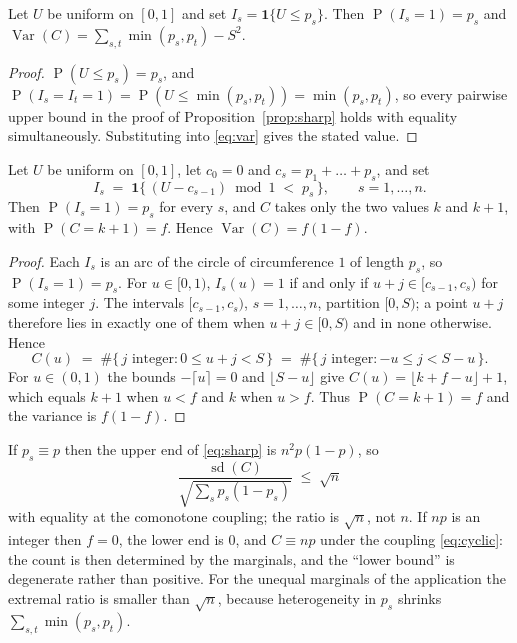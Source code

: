 \begin{lemma}
\label{lem:comon}
Let $U$ be uniform on $[0,1]$ and set $I_s = \mathbf{1}\{U \le p_s\}$.  Then
$\operatorname{P}(I_s=1)=p_s$ and
$\operatorname{Var}(C) = \sum_{s,t}\min(p_s,p_t) - S^2$.
\end{lemma}

\begin{proof}
$\operatorname{P}(U \le p_s) = p_s$, and
$\operatorname{P}(I_s=I_t=1) = \operatorname{P}(U \le \min(p_s,p_t)) =
\min(p_s,p_t)$, so every pairwise upper bound in the proof of
Proposition~\ref{prop:sharp} holds with equality simultaneously.  Substituting
into \eqref{eq:var} gives the stated value.
\end{proof}

\begin{lemma}
\label{lem:cyclic}
Let $U$ be uniform on $[0,1]$, let $c_0=0$ and $c_s = p_1+\dots+p_s$, and set
\begin{equation}
  I_s \;=\; \mathbf{1}\bigl\{\, (U - c_{s-1}) \bmod 1 \;<\; p_s \,\bigr\},
  \qquad s = 1,\dots,n .
  \label{eq:cyclic}
\end{equation}
Then $\operatorname{P}(I_s=1)=p_s$ for every $s$, and $C$ takes only the two
values $k$ and $k+1$, with $\operatorname{P}(C=k+1)=f$.  Hence
$\operatorname{Var}(C)=f(1-f)$.
\end{lemma}

\begin{proof}
Each $I_s$ is an arc of the circle of circumference $1$ of length $p_s$, so
$\operatorname{P}(I_s=1)=p_s$.  For $u \in [0,1)$, $I_s(u)=1$ if and only if
$u+j \in [c_{s-1},c_s)$ for some integer $j$.  The intervals
$[c_{s-1},c_s)$, $s=1,\dots,n$, partition $[0,S)$; a point $u+j$ therefore lies
in exactly one of them when $u+j \in [0,S)$ and in none otherwise.  Hence
\[
  C(u) \;=\; \#\{\, j \text{ integer} : 0 \le u+j < S \,\}
        \;=\; \#\{\, j \text{ integer} : -u \le j < S-u \,\}.
\]
For $u \in (0,1)$ the bounds $-\lceil u \rceil = 0$ and $\lfloor S-u \rfloor$
give $C(u) = \lfloor k+f-u \rfloor + 1$, which equals $k+1$ when $u<f$ and $k$
when $u>f$.  Thus $\operatorname{P}(C=k+1)=f$ and the variance is
$f(1-f)$.
\end{proof}

\begin{corollary}
\label{cor:equal}
If $p_s \equiv p$ then the upper end of \eqref{eq:sharp} is $n^2p(1-p)$, so
\[
  \frac{\operatorname{sd}(C)}{\sqrt{\sum_s p_s(1-p_s)}} \;\le\; \sqrt{n}
\]
with equality at the comonotone coupling; the ratio is $\sqrt n$, not $n$.  If
$np$ is an integer then $f=0$, the lower end is $0$, and
$C \equiv np$ under the coupling \eqref{eq:cyclic}: the count is then
determined by the marginals, and the ``lower bound'' is degenerate rather than
positive.  For the unequal marginals of the application the extremal ratio is
smaller than $\sqrt n$, because heterogeneity in $p_s$ shrinks
$\sum_{s,t}\min(p_s,p_t)$.
\end{corollary}

